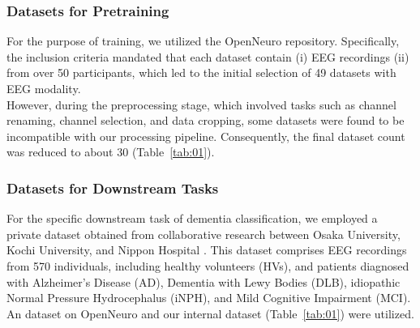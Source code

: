 \documentclass[final,3p,times,twocolumn]{elsarticle}
\begin{document}
\subsubsection{Datasets for Pretraining}
For the purpose of training, we utilized the OpenNeuro repository. Specifically, the inclusion criteria mandated that each dataset contain (i) EEG recordings (ii) from over 50 participants, which led to the initial selection of 49 datasets with EEG modality. \cite{ds004902:1.0.0} \cite{ds004883:1.0.0} \cite{ds004771:1.0.0} \cite{ds004718:1.0.4} \cite{ds004626:1.0.2} \cite{ds004602:1.0.1} \cite{ds004595:1.0.0} \cite{ds004584:1.0.0} \cite{ds004580:1.0.0} \cite{ds004579:1.0.0} \cite{ds004577:1.0.1} \cite{ds004574:1.0.0} \cite{ds004572:1.2.0} \cite{ds004532:1.2.0} \cite{ds004515:1.0.0} \cite{ds004504:1.0.6} \cite{ds004448:1.0.2} \cite{ds004395:2.0.0} \cite{ds004362:1.0.0} \cite{ds004317:1.0.3} \cite{ds004315:1.0.0} \cite{ds004279:1.1.1} \cite{ds004256:1.0.5} \cite{ds004186:2.0.0} \cite{ds004166:1.0.0} \cite{ds004151:1.0.0} \cite{ds004148:1.0.1} \cite{ds004120:1.0.0} \cite{ds004118:1.0.1} \cite{ds004067:1.0.1} \cite{ds004019:1.0.0} \cite{ds003969:1.0.0} \cite{ds003947:1.0.1} \cite{ds003944:1.0.1} \cite{ds003838:1.0.5} \cite{ds003825:1.2.0} \cite{ds003775:1.2.1} \cite{ds003690:1.0.0} \cite{ds003655:1.0.2} \cite{ds003638:1.0.0} \cite{ds003602:1.0.1} \cite{ds003523:1.1.0} \cite{ds003522:1.1.0} \cite{ds003518:1.1.0} \cite{ds003509:1.1.0} \cite{ds003506:1.1.0} \cite{ds003490:1.1.0} \cite{ds003478:1.1.0} \cite{ds003474:1.1.0}
\\
\indent
However, during the preprocessing stage, which involved tasks such as channel renaming, channel selection, and data cropping, some datasets were found to be incompatible with our processing pipeline. Consequently, the final dataset count was reduced to about 30 (Table~\ref{tab:01}).
\\
\indent
\subsubsection{Datasets for Downstream Tasks}
For the specific downstream task of dementia classification, we employed a private dataset obtained from collaborative research between Osaka University, Kochi University, and Nippon Hospital \cite{hata_precise_2023} \cite{watanabe_deep_2024}. This dataset comprises EEG recordings from 570 individuals, including healthy volunteers (HVs), and patients diagnosed with Alzheimer's Disease (AD), Dementia with Lewy Bodies (DLB), idiopathic Normal Pressure Hydrocephalus (iNPH), and Mild Cognitive Impairment (MCI).
An dataset on OpenNeuro \cite{ds003555:1.0.0} and our internal dataset (Table~\ref{tab:01}) were utilized.
\end{document}
